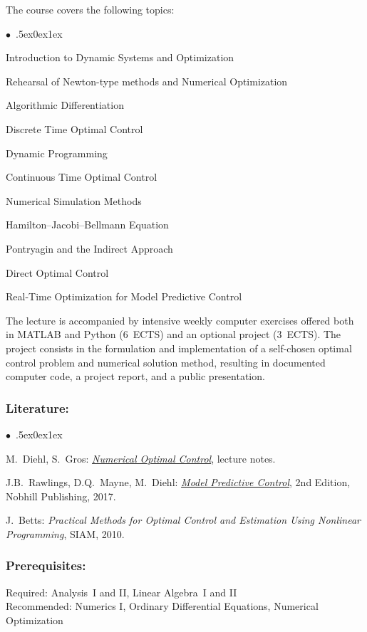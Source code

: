 \documentclass[a4paper,10pt]{article}
\renewenvironment{itemize}{\begin{list}{$\bullet$\ }{\itemsep.5ex\setlength{\topsep}{0.5\itemsep}\parsep0ex\labelsep1ex\settowidth{\labelwidth}{$\bullet$\ }\setlength{\leftmargin}{\labelwidth}\addtolength{\leftmargin}{3ex}\addtolength{\leftmargin}{\labelsep}}}{\end{list}}
\begin{document}
The course covers the following topics:
\begin{itemize}
\item Introduction to Dynamic Systems and Optimization
\item  Rehearsal of Newton-type methods and Numerical Optimization
\item  Algorithmic Differentiation
\item  Discrete Time Optimal Control
\item  Dynamic Programming
\item  Continuous Time Optimal Control
\item  Numerical Simulation Methods
\item  Hamilton–Jacobi–Bellmann Equation
\item  Pontryagin and the Indirect Approach
\item  Direct Optimal Control
\item  Real-Time Optimization for Model Predictive Control
\end{itemize}

The lecture is accompanied by intensive weekly computer exercises offered both in MATLAB and Python (6~ECTS) and an optional project (3~ECTS). The project consists in the formulation and implementation of a self-chosen optimal control problem and numerical solution method, resulting in documented computer code, a project report, and a public presentation.
\subsubsection*{\large
    Literature:
}
\begin{itemize}
\item
 M.~Diehl, S.~Gros: \href{https://www.syscop.de/files/2020ss/NOC/book-NOCSE.pdf}{\emph{Numerical Optimal Control}}, lecture notes. 
\item
J.B.~Rawlings, D.Q.~Mayne, M.~Diehl: \href{https://sites.engineering.ucsb.edu/\~jbraw/mpc/MPC-book-2nd-edition-4th-printing.pdf}{\emph{Model Predictive Control}}, 2nd Edition, Nobhill Publishing, 2017.
\item
J.~Betts: \emph{Practical Methods for Optimal Control and Estimation Using Nonlinear Programming}, SIAM, 2010.
\end{itemize}
\subsubsection*{\large
    Prerequisites:
}
Required: Analysis~I and II, Linear Algebra~I and II \\
Recommended: Numerics I, Ordinary Differential Equations, Numerical Optimization
\end{document}
